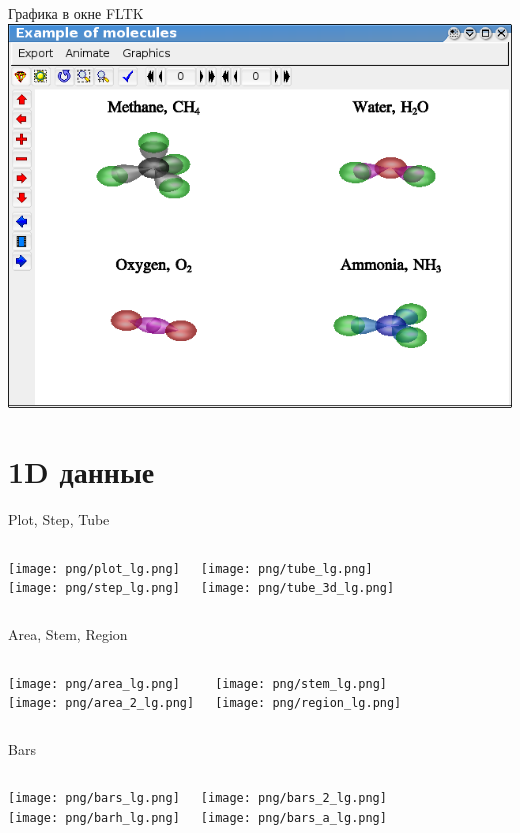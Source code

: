 \documentclass[color=usenames]{beamer}
\begin{document}
\begin{frame}{Графика в окне FLTK}
\includegraphics[width = 0.9 \textwidth]{fltk.png}
\end{frame}


\section{1D данные}

\begin{frame}{Plot, Step, Tube}
\begin{columns}
\texttt{[image: png/plot\_lg.png]}\\
\texttt{[image: png/step\_lg.png]}

\texttt{[image: png/tube\_lg.png]}\\
\texttt{[image: png/tube\_3d\_lg.png]}

\end{columns}
\end{frame}

\begin{frame}{Area, Stem, Region}
\begin{columns}
\texttt{[image: png/area\_lg.png]}\\
\texttt{[image: png/area\_2\_lg.png]}

\texttt{[image: png/stem\_lg.png]}\\
\texttt{[image: png/region\_lg.png]}

\end{columns}
\end{frame}

\begin{frame}{Bars}
\begin{columns}
\texttt{[image: png/bars\_lg.png]}\\
\texttt{[image: png/barh\_lg.png]}

\texttt{[image: png/bars\_2\_lg.png]}\\
\texttt{[image: png/bars\_a\_lg.png]}

\end{columns}
\end{frame}
\end{document}
